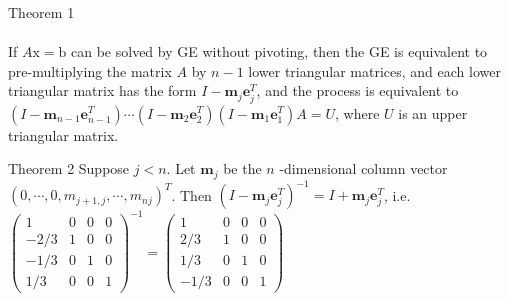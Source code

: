\documentclass[10pt,landscape]{article}
\theoremstyle{definition}
\newcommand{\thistheoremname}{}
\newtheorem*{genericthm*}{\thistheoremname}
\newenvironment{namedthm*}[1]
{\renewcommand{\thistheoremname}{#1}\begin{genericthm*}}
{\end{genericthm*}}
\begin{document}
\begin{multicols}{3}
\begin{namedthm*}{Theorem 1}
$$$$\\
If $A \mathrm{x}=\mathrm{b}$ can be solved by GE without pivoting, then the GE is equivalent to pre-multiplying the matrix $A$ by $n-1$ lower triangular matrices, and each lower triangular matrix has the form $I-\mathbf{m}_{j} \mathbf{e}_{j}^{T}$, and the process is equivalent to $\left(I-\mathbf{m}_{n-1} \mathbf{e}_{n-1}^{T}\right) \cdots\left(I-\mathbf{m}_{2} \mathbf{e}_{2}^{T}\right)\left(I-\mathbf{m}_{1} \mathbf{e}_{1}^{T}\right) A=U$, where $U$ is an upper triangular matrix.
\end{namedthm*}


\begin{namedthm*}{Theorem 2}
Suppose $j<n .$ Let $\mathbf{m}_{j}$ be the $n$ -dimensional column vector $\left(0, \cdots, 0, m_{j+1, j}, \cdots, m_{n j}\right)^{T}$. Then $\left(I-\mathbf{m}_{j} \mathbf{e}_{j}^{T}\right)^{-1}=I+\mathbf{m}_{j} \mathbf{e}_{j}^{T}$, i.e.
$\left(\begin{array}{rrrr}{1} & {0} & {0} & {0} \\ {-2 / 3} & {1} & {0} & {0} \\ {-1 / 3} & {0} & {1} & {0} \\ {1 / 3} & {0} & {0} & {1}\end{array}\right)^{-1}=\left(\begin{array}{rrrr}{1} & {0} & {0} & {0} \\ {2 / 3} & {1} & {0} & {0} \\ {1 / 3} & {0} & {1} & {0} \\ {-1 / 3} & {0} & {0} & {1}\end{array}\right)$
\end{namedthm*}




\end{multicols}
\end{document}
